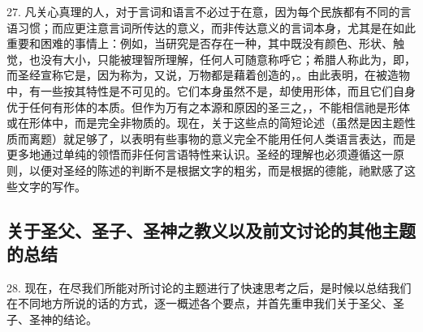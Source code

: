 27. 凡关心真理的人，对于言词和语言不必过于在意，因为每个民族都有不同的言语习惯；而应更注意言词所传达的意义，而非传达意义的言词本身，尤其是在如此重要和困难的事情上：例如，当研究是否存在一种，其中既没有颜色、形状、触觉，也没有大小，只能被理智所理解，任何人可随意称呼它；希腊人称此为，即，而圣经宣称它是，因为称为，又说，万物都是藉着创造的，。由此表明，在被造物中，有一些按其特性是不可见的。它们本身虽然不是，却使用形体，而且它们自身优于任何有形体的本质。但作为万有之本源和原因的圣三之，，不能相信祂是形体或在形体中，而是完全非物质的。现在，关于这些点的简短论述（虽然是因主题性质而离题）就足够了，以表明有些事物的意义完全不能用任何人类语言表达，而是更多地通过单纯的领悟而非任何言语特性来认识。圣经的理解也必须遵循这一原则，以便对圣经的陈述的判断不是根据文字的粗劣，而是根据的德能，祂默感了这些文字的写作。\par


\subsection{关于圣父、圣子、圣神之教义以及前文讨论的其他主题的总结}

28. 现在，在尽我们所能对所讨论的主题进行了快速思考之后，是时候以总结我们在不同地方所说的话的方式，逐一概述各个要点，并首先重申我们关于圣父、圣子、圣神的结论。\par

